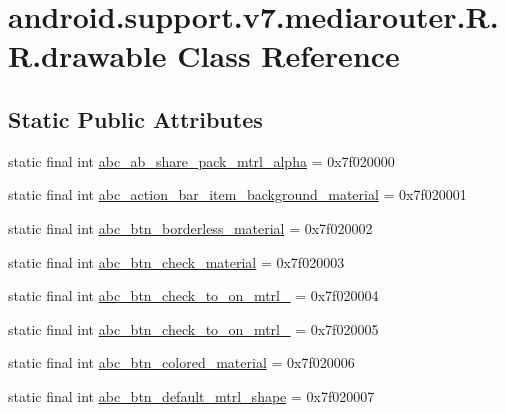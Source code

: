 \hypertarget{classandroid_1_1support_1_1v7_1_1mediarouter_1_1_r_1_1drawable}{
\section{android.support.v7.mediarouter.R.R.drawable Class Reference}
\label{classandroid_1_1support_1_1v7_1_1mediarouter_1_1_r_1_1drawable}
}
\subsection*{Static Public Attributes}
\begin{CompactItemize}
\item 
static final int \hyperlink{classandroid_1_1support_1_1v7_1_1mediarouter_1_1_r_1_1drawable_3624ada5530ff554360f82289229469a}{abc\_\-ab\_\-share\_\-pack\_\-mtrl\_\-alpha} = 0x7f020000
\item 
static final int \hyperlink{classandroid_1_1support_1_1v7_1_1mediarouter_1_1_r_1_1drawable_c6941246835da67e6a4d095048d63e1d}{abc\_\-action\_\-bar\_\-item\_\-background\_\-material} = 0x7f020001
\item 
static final int \hyperlink{classandroid_1_1support_1_1v7_1_1mediarouter_1_1_r_1_1drawable_9f3bb65cb60c00f0c834270228901239}{abc\_\-btn\_\-borderless\_\-material} = 0x7f020002
\item 
static final int \hyperlink{classandroid_1_1support_1_1v7_1_1mediarouter_1_1_r_1_1drawable_0191ea635ab692a2df9c960623bb71ee}{abc\_\-btn\_\-check\_\-material} = 0x7f020003
\item 
static final int \hyperlink{classandroid_1_1support_1_1v7_1_1mediarouter_1_1_r_1_1drawable_9f68b89e2e31fde1e9fe40a22d0c2bf5}{abc\_\-btn\_\-check\_\-to\_\-on\_\-mtrl\_} = 0x7f020004
\item 
static final int \hyperlink{classandroid_1_1support_1_1v7_1_1mediarouter_1_1_r_1_1drawable_18217b4f92ee7a3fe2538b7cd143e2eb}{abc\_\-btn\_\-check\_\-to\_\-on\_\-mtrl\_} = 0x7f020005
\item 
static final int \hyperlink{classandroid_1_1support_1_1v7_1_1mediarouter_1_1_r_1_1drawable_a8dfa13b554718f90f18ccdf1ee6074d}{abc\_\-btn\_\-colored\_\-material} = 0x7f020006
\item 
static final int \hyperlink{classandroid_1_1support_1_1v7_1_1mediarouter_1_1_r_1_1drawable_6cfe9de9ca6739878d594b2cd721bad6}{abc\_\-btn\_\-default\_\-mtrl\_\-shape} = 0x7f020007
\item 

\end{CompactItemize}
